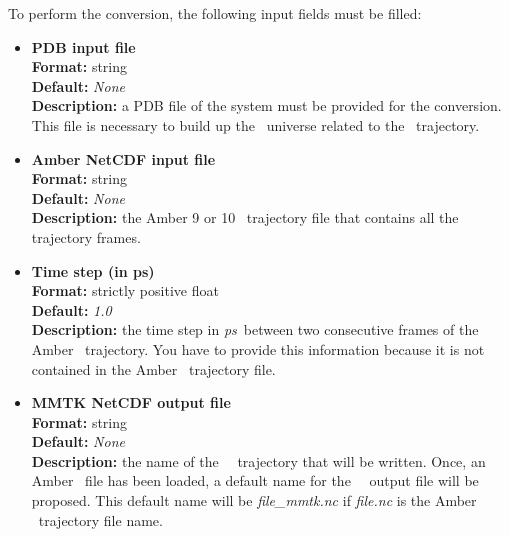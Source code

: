 \documentclass[a4paper,11pt]{report}
\newcommand{\ps}{\textit{ps}}
\begin{document}
To perform the conversion, the following input fields must be filled:
\begin{itemize}
\item \textbf{PDB input file}\\
\textbf{Format:} string\\
\textbf{Default:} \textit{None}\\
\textbf{Description:} a PDB file of the system must be provided for the conversion. This file is necessary to build up the 
\MMTK\ universe related to the \MMTK\ trajectory. 

\item \textbf{Amber NetCDF input file}\\
\textbf{Format:} string\\
\textbf{Default:} \textit{None}\\
\textbf{Description:} the Amber 9 or 10 \NetCDF\ trajectory file that contains all the trajectory frames.

\item \textbf{Time step (in ps)}\\
\textbf{Format:} strictly positive float\\
\textbf{Default:} \textit{1.0}\\
\textbf{Description:} the time step in \ps\ between two consecutive frames of the Amber \NetCDF\ trajectory. You have to provide 
this information because it is not contained in the Amber \NetCDF\ trajectory file.

\item \textbf{MMTK NetCDF output file}\\
\textbf{Format:} string\\
\textbf{Default:} \textit{None}\\
\textbf{Description:} the name of the \MMTK\ \NetCDF\ trajectory that will be written. Once, an Amber \NetCDF\ 
file has been loaded, a default name for the \MMTK\ \NetCDF\ output file will be proposed. This default name will be 
\textit{file\_mmtk.nc} if \textit{file.nc} is the Amber \NetCDF\ trajectory file name.
\end{itemize}
\end{document}
